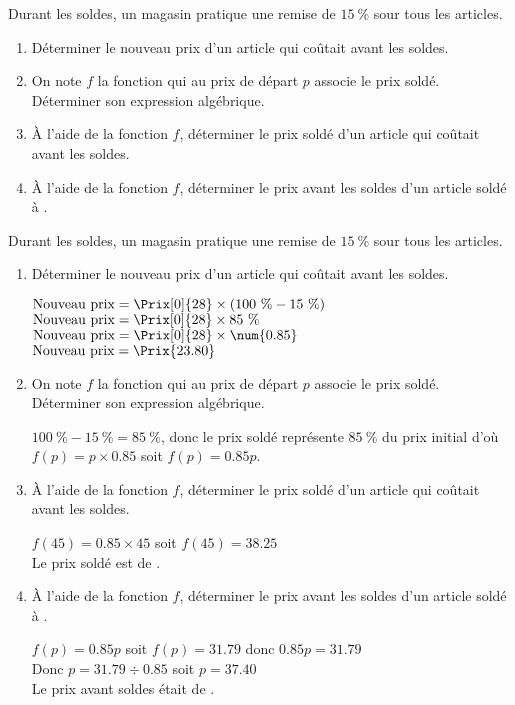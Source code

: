\begin{exercice}
    Durant les soldes, un magasin pratique une remise de $15~\%$ sour tous les articles.
    \begin{enumerate}
        \item Déterminer le nouveau prix d'un article qui coûtait  avant les soldes.
        \item On note $f$ la fonction qui au prix de départ $p$ associe le prix soldé. Déterminer son expression algébrique.
        \item À l'aide de la fonction $f$, déterminer le prix soldé d'un article qui coûtait  avant les soldes.
        \item À l'aide de la fonction $f$, déterminer le prix avant les soldes d'un article soldé à .
    \end{enumerate}
\end{exercice}
\begin{corrige}
    Durant les soldes, un magasin pratique une remise de $15~\%$ sour tous les articles.

    \begin{enumerate}
        \item Déterminer le nouveau prix d'un article qui coûtait  avant les soldes.
        
        {\red 
        $\text{Nouveau prix} = \Prix[0]{28}\times (100~\% - 15~\%)$\\
        $\text{Nouveau prix} = \Prix[0]{28}\times 85~\%$\\
        $\text{Nouveau prix} = \Prix[0]{28}\times \num{0.85}$\\
        $\text{Nouveau prix} = \Prix{23.80}$
        }
        \item On note $f$ la fonction qui au prix de départ $p$ associe le prix soldé. Déterminer son expression algébrique.
        
        {\red $100~\% - 15~\% = 85~\%$, donc le prix soldé représente $85~\%$ du prix initial d'où $f(p)=p\times\num{0.85}$ soit $f(p)=\num{0.85}p$.}
    \end{enumerate}
    \Coupe
    \begin{enumerate}
        \setcounter{enumi}{2}
        \item À l'aide de la fonction $f$, déterminer le prix soldé d'un article qui coûtait  avant les soldes.
        
        {\red $f(45)=\num{0.85}\times 45$ soit $f(45)=\num{38.25}$\\
        Le prix soldé est de .
        }
        \item À l'aide de la fonction $f$, déterminer le prix avant les soldes d'un article soldé à .
        
        {\red
        $f(p)=\num{0.85}p$ soit $f(p)=\num{31.79}$ donc $\num{0.85}p=\num{31.79}$\\
        Donc $p=\num{31.79}\div\num{0.85}$ soit $p=\num{37.40}$\\
        Le prix avant soldes était de .
        }
    \end{enumerate}
\end{corrige}

